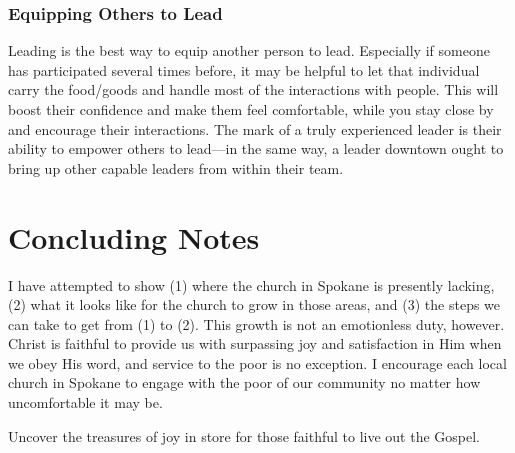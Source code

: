 \documentclass[12pt]{article}
\begin{document}
\subsubsection{Equipping Others to Lead}

    Leading is the best way to equip another person to lead.
    Especially if someone has participated several times before, it may be helpful to let that individual carry the food/goods and handle most of the interactions with people.
    This will boost their confidence and make them feel comfortable, while you stay close by and encourage their interactions.
    The mark of a truly experienced leader is their ability to empower others to lead---in the same way, a leader downtown ought to bring up other capable leaders from within their team.


\section{Concluding Notes}

    \qChristianHedonism
    I have attempted to show (1) where the church in Spokane is presently lacking, (2) what it looks like for the church to grow in those areas, and (3) the steps we can take to get from (1) to (2).
    This growth is not an emotionless duty, however.
    Christ is faithful to provide us with surpassing joy and satisfaction in Him when we obey His word, and service to the poor is no exception.
    I encourage each local church in Spokane to engage with the poor of our community no matter how uncomfortable it may be.
    \par Uncover the treasures of joy in store for those faithful to live out the Gospel.

% 
% 
\end{document}

